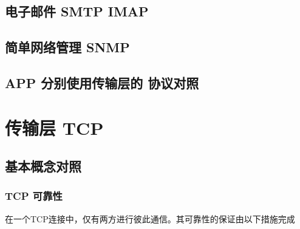 \documentclass[UTF8,a4paper,12pt]{ctexbook}
\begin{document}
		\subsection{电子邮件 SMTP IMAP}	
		
		\subsection{简单网络管理 SNMP}
		
		\subsection{APP 分别使用传输层的 协议对照}
			\begin{figure}[h]
				\centering
			\end{figure}
		
	\section{传输层 TCP}		
		\subsection{基本概念对照} 
			\subsubsection{TCP 可靠性}
				在一个TCP连接中，仅有两方进行彼此通信。其可靠性的保证由以下措施完成
				
\end{document}
